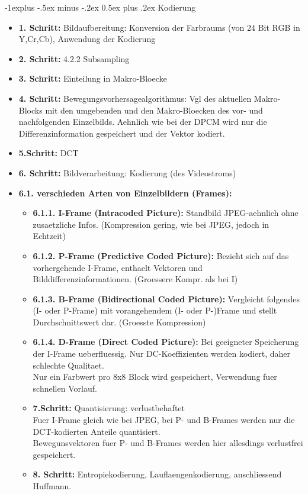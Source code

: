 \documentclass[10pt,landscape]{article}
\makeatletter
\renewcommand{\subsection}{\@startsection{subsection}{2}{0mm}%
                                {-1explus -.5ex minus -.2ex}%
                                {0.5ex plus .2ex}%
                                {\normalfont\normalsize\bfseries}}
\makeatother
\begin{document}
\begin{multicols}{3}
\subsection{Kodierung}
\begin{itemize}
    \item \textbf{1. Schritt:} Bildaufbereitung: Konversion der Farbraums (von 24 Bit RGB in Y,Cr,Cb), Anwendung der Kodierung
    \item \textbf{2. Schritt:} 4.2.2 Subsampling
    \item \textbf{3. Schritt:} Einteilung in Makro-Bloecke
    \item \textbf{4. Schritt:} Bewegungsvorhersagealgorithmus: Vgl des aktuellen Makro-Blocks mit den umgebenden und den Makro-Bloecken des vor- und nachfolgenden Einzelbilds. Aehnlich wie bei der DPCM wird nur die Differenzinformation gespeichert und der Vektor kodiert.
    \item \textbf{5.Schritt:} DCT
    \item \textbf{6. Schritt:} Bildverarbeitung: Kodierung (des Videostroms)
    \item \textbf{6.1. verschieden Arten von Einzelbildern (Frames):}
    \begin{itemize}
        \item \textbf{6.1.1. I-Frame (Intracoded Picture):}
            Standbild JPEG-aehnlich ohne zusaetzliche Infos. (Kompression gering, wie bei JPEG, jedoch in Echtzeit)
        \item \textbf{6.1.2. P-Frame (Predictive Coded Picture):}
            Bezieht sich auf das vorhergehende I-Frame, enthaelt Vektoren und Bilddifferenzinformationen. (Groessere Kompr. als bei I)
        \item \textbf{6.1.3. B-Frame (Bidirectional Coded Picture):}
            Vergleicht folgendes (I- oder P-Frame) mit vorangehendem (I- oder P-)Frame und stellt Durchschnittswert dar. (Groesste Kompression)
        \item \textbf{6.1.4. D-Frame (Direct Coded Picture):}
            Bei geeigneter Speicherung der I-Frame ueberfluessig. Nur DC-Koeffizienten werden kodiert, daher schlechte Qualitaet.\\
            Nur ein Farbwert pro 8x8 Block wird gespeichert, Verwendung fuer schnellen Vorlauf.
        \item \textbf{7.Schritt:} Quantisierung: verlustbehaftet\\
            Fuer I-Frame gleich wie bei JPEG, bei P- und B-Frames werden nur die DCT-kodierten Anteile quantisiert.\\
            Bewegunsvektoren fuer P- und B-Frames werden hier allesdings verlustfrei gespeichert.
        \item \textbf{8. Schritt:} Entropiekodierung, Lauflaengenkodierung, anschliessend Huffmann.
    \end{itemize}
\end{itemize}


\end{multicols}
\end{document}
